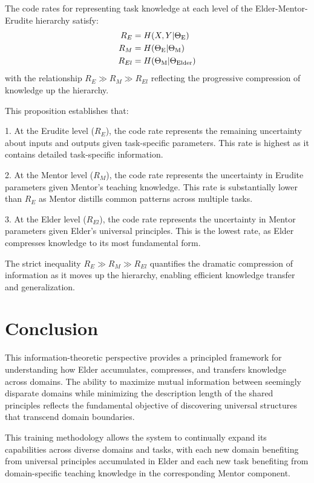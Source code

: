 \begin{proposition}
The code rates for representing task knowledge at each level of the Elder-Mentor-Erudite hierarchy satisfy:
\begin{align}
R_E &= H(X, Y | \Theta_{\text{E}}) \\
R_M &= H(\Theta_{\text{E}} | \Theta_{\text{M}}) \\
R_{El} &= H(\Theta_{\text{M}} | \Theta_{\text{Elder}})
\end{align}
with the relationship $R_E \gg R_M \gg R_{El}$ reflecting the progressive compression of knowledge up the hierarchy.
\end{proposition}

This proposition establishes that:

1. At the Erudite level ($R_E$), the code rate represents the remaining uncertainty about inputs and outputs given task-specific parameters. This rate is highest as it contains detailed task-specific information.

2. At the Mentor level ($R_M$), the code rate represents the uncertainty in Erudite parameters given Mentor's teaching knowledge. This rate is substantially lower than $R_E$ as Mentor distills common patterns across multiple tasks.

3. At the Elder level ($R_{El}$), the code rate represents the uncertainty in Mentor parameters given Elder's universal principles. This is the lowest rate, as Elder compresses knowledge to its most fundamental form.

The strict inequality $R_E \gg R_M \gg R_{El}$ quantifies the dramatic compression of information as it moves up the hierarchy, enabling efficient knowledge transfer and generalization.

\section{Conclusion}

This information-theoretic perspective provides a principled framework for understanding how Elder accumulates, compresses, and transfers knowledge across domains. The ability to maximize mutual information between seemingly disparate domains while minimizing the description length of the shared principles reflects the fundamental objective of discovering universal structures that transcend domain boundaries.

This training methodology allows the system to continually expand its capabilities across diverse domains and tasks, with each new domain benefiting from universal principles accumulated in Elder and each new task benefiting from domain-specific teaching knowledge in the corresponding Mentor component.